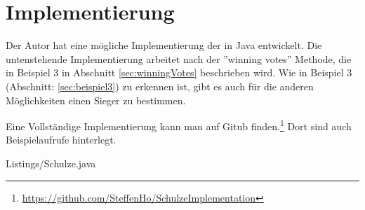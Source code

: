 \section{Implementierung}
\label{sec:implementierung}

Der Autor hat eine mögliche Implementierung der \schulze in Java entwickelt. Die untenstehende Implementierung arbeitet nach der ''winning votes'' Methode, die in Beispiel 3 in Abschnitt \ref{sec:winningVotes} beschrieben wird. Wie in Beispiel 3 (Abschnitt: \ref{sec:beispiel3}) zu erkennen ist, gibt es auch für die anderen Möglichkeiten einen Sieger zu bestimmen.

Eine Vollständige Implementierung kann man auf Gitub finden.\footnote{\url{https://github.com/SteffenHo/SchulzeImplementation}} Dort sind auch Beispielaufrufe hinterlegt. 


{Listings/Schulze.java}

